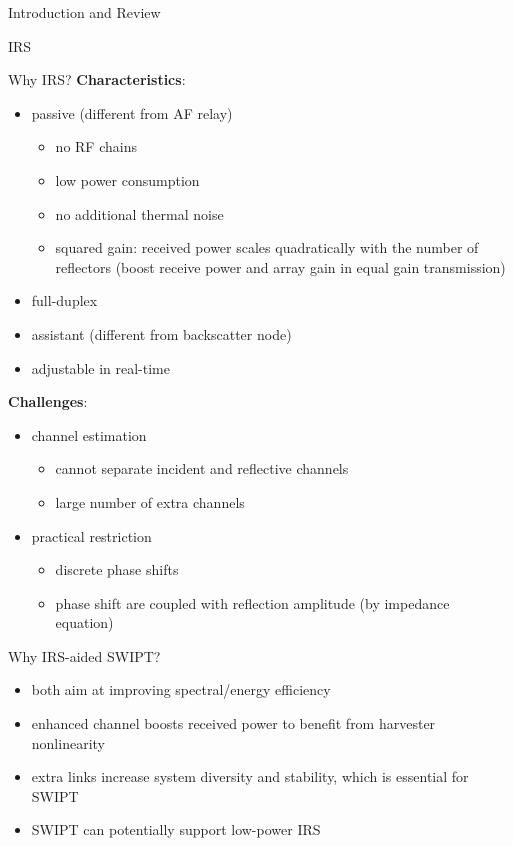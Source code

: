 \documentclass[9pt]{beamer}
\begin{document}
\begin{section}{Introduction and Review}
\begin{subsection}{IRS}
		\begin{frame}{Why IRS?}
			\textbf{Characteristics}:
			\begin{itemize}
				\item passive (different from AF relay)
				\begin{itemize}
					\item no RF chains
					\item low power consumption
					\item no additional thermal noise
					\item \alert{squared gain}: received power scales quadratically with the number of reflectors (boost receive power and array gain in equal gain transmission)
				\end{itemize}
				\item full-duplex
				\item assistant (different from backscatter node)
				\item adjustable in real-time
			\end{itemize}
			\vspace{1em}
			\textbf{Challenges}:
			\begin{itemize}
				\item channel estimation
				\begin{itemize}
					\item cannot separate incident and reflective channels
					\item large number of extra channels
				\end{itemize}
				\item practical restriction
				\begin{itemize}
					\item discrete phase shifts
					\item phase shift are coupled with reflection amplitude (by impedance equation)
				\end{itemize}
			\end{itemize}
		\end{frame}

		\begin{frame}{Why IRS-aided SWIPT?}
			\begin{itemize}
				\item both aim at improving spectral/energy efficiency
				\item enhanced channel boosts received power to benefit from harvester nonlinearity
				\item extra links increase system diversity and stability, which is essential for SWIPT
				\item SWIPT can potentially support low-power IRS
			\end{itemize}
		\end{frame}
	\end{subsection}


\end{section}
\end{document}
